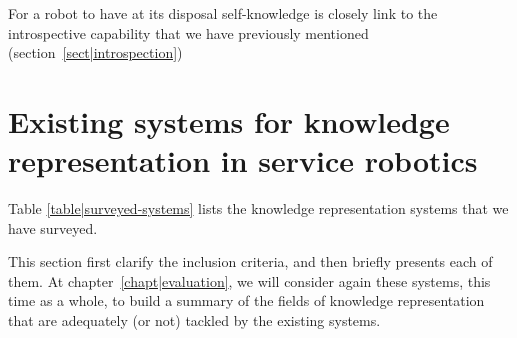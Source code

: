 For a robot to have at its disposal self-knowledge is closely link to the
introspective capability that we have previously mentioned
(section~\ref{sect|introspection})


\section{Existing systems for knowledge representation in service robotics}
\label{sect|surveyed-systems}


Table \ref{table|surveyed-systems} lists the knowledge representation
systems that we have surveyed.

This section first clarify the inclusion criteria, and then briefly presents
each of them. At chapter~\ref{chapt|evaluation}, we will consider again these
systems, this time as a whole, to build a summary of the fields of knowledge
representation that are adequately (or not) tackled by the existing systems.

